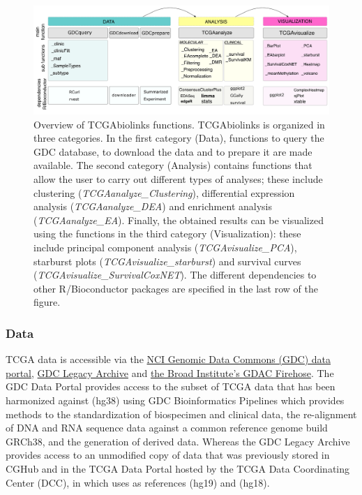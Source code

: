 \begin{figure}
\centering
\includegraphics[width=1.0\linewidth]{images/figure1_new.pdf}


\caption[Overview of TCGAbiolinks functions.]{ Overview of TCGAbiolinks functions. TCGAbiolinks is organized in three categories. In the first category (Data), functions to query the GDC database, to download the data and to prepare it are made available. The second category (Analysis) contains functions that allow the user to carry out different types of analyses; these include clustering (\textit{TCGAanalyze\_Clustering}), differential expression analysis (\textit{TCGAanalyze\_DEA}) and enrichment analysis (\textit{TCGAanalyze\_EA}). Finally, the obtained results can be visualized using the functions in the third category (Visualization): these include principal component analysis (\textit{TCGAvisualize\_PCA}), starburst plots (\textit{TCGAvisualize\_starburst}) and survival curves (\textit{TCGAvisualize\_SurvivalCoxNET}). The different dependencies to other R/Bioconductor packages are specified in the last row of the figure.  }
\label{fig:tcgabiolinksfunctions}
\end{figure}

\subsubsection*{Data}

TCGA data is accessible via the \href{https://gdc-portal.nci.nih.gov/}{NCI Genomic Data Commons (GDC) data portal}, \href{https://gdc-portal.nci.nih.gov/legacy-archive/search/f}{GDC Legacy Archive} and \href{https://github.com/BioinformaticsFMRP/TCGAWorkflow/blob/master/vignettes/gdac.broadinstitute.org}{the Broad Institute’s GDAC Firehose}. The GDC Data Portal provides access to the subset of TCGA data that has been harmonized against  (hg38) using GDC Bioinformatics Pipelines which provides methods to the standardization of biospecimen and clinical data, the re-alignment of DNA and RNA sequence data against a common reference genome build GRCh38, and the generation of derived data. Whereas the GDC Legacy Archive provides access to an unmodified copy of data that was previously stored in CGHub \cite{wilks2014cancer} and in the TCGA Data Portal hosted by the TCGA Data Coordinating Center (DCC), in which uses as references  (hg19) and  (hg18).

